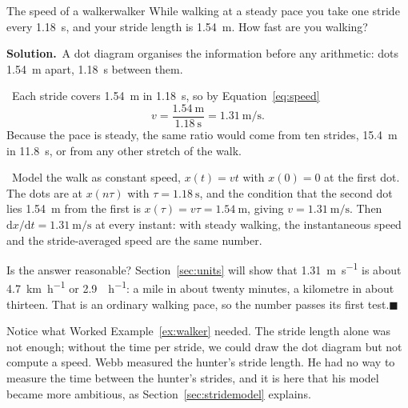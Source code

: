 \documentclass[11pt,twoside,openany]{book}
\newcommand{\dd}{\mathrm{d}}
\newcommand{\viewtag}[3]{\fcolorbox{#2}{#3}{\footnotesize\textbf{\textcolor{#2}{#1}}}}
\newcommand{\elemtag}{\viewtag{Elementary}{elemcol}{elempale}}
\newcommand{\calctag}{\viewtag{Calculus}{calccol}{calcpale}}
\newcommand{\elem}{\par\medskip\noindent\elemtag\ }
\newcommand{\calc}{\par\medskip\noindent\calctag\ }
\newcommand{\solution}{\par\smallskip\noindent\textbf{Solution.}\ }
\newcommand{\qed}{\hfill$\blacksquare$}
\begin{document}
\begin{example}{The speed of a walker}{walker}
While walking at a steady pace you take one stride every \SI{1.18}{\second}, and your stride length is \SI{1.54}{\metre}. How fast are you walking?

\solution A dot diagram organises the information before any arithmetic: dots \SI{1.54}{\metre} apart, \SI{1.18}{\second} between them.
\begin{center}
\end{center}

\elem Each stride covers \SI{1.54}{\metre} in \SI{1.18}{\second}, so by Equation~\eqref{eq:speed}
\[
v = \frac{\SI{1.54}{\metre}}{\SI{1.18}{\second}} = \SI{1.31}{\metre\per\second}.
\]
Because the pace is steady, the same ratio would come from ten strides, \SI{15.4}{\metre} in \SI{11.8}{\second}, or from any other stretch of the walk.

\calc Model the walk as constant speed, $x(t) = vt$ with $x(0) = 0$ at the first dot. The dots are at $x(n\tau)$ with $\tau = \SI{1.18}{\second}$, and the condition that the second dot lies \SI{1.54}{\metre} from the first is $x(\tau) = v\tau = \SI{1.54}{\metre}$, giving $v = \SI{1.31}{\metre\per\second}$. Then $\dd x/\dd t = \SI{1.31}{\metre\per\second}$ at every instant: with steady walking, the instantaneous speed and the stride-averaged speed are the same number.

Is the answer reasonable? Section~\ref{sec:units} will show that \SI{1.31}{\metre\per\second} is about \SI{4.7}{\kilo\metre\per\hour} or \SI{2.9}{\mile\per\hour}: a mile in about twenty minutes, a kilometre in about thirteen. That is an ordinary walking pace, so the number passes its first test.\qed
\end{example}

Notice what Worked Example~\ref{ex:walker} needed. The stride length alone was not enough; without the time per stride, we could draw the dot diagram but not compute a speed. Webb measured the hunter's stride length. He had no way to measure the time between the hunter's strides, and it is here that his model became more ambitious, as Section~\ref{sec:stridemodel} explains.
\end{document}
